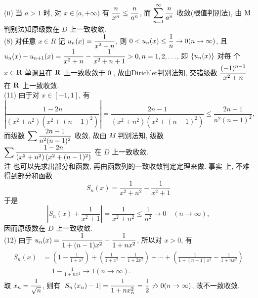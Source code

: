 \documentclass[a4paper,11pt,UTF8]{article}
\begin{document}
(ii) 当 $a>1$ 时, 对 $x \in[a,+\infty)$ 有 $\displaystyle \displaystyle \displaystyle \frac{n}{x^n} \leq \frac{n}{a^n}$, 而 $\displaystyle \displaystyle \displaystyle \sum_{n=1}^{\infty} \frac{n}{a^n}$ 收敛(根值判别法), 由 $\displaystyle \displaystyle \displaystyle \mathrm{M}$ 判别法知原级数在 $D$ 上一致收敛.\\
(8) 对任意 $x \in R$ 记 $\displaystyle \displaystyle \displaystyle u_n(x)=\frac{1}{x^2+n}$, 则 $\displaystyle \displaystyle \displaystyle 0<u_n(x) \leq \frac{1}{n} \rightarrow 0(n \rightarrow \infty)$, 且 $\displaystyle \displaystyle \displaystyle u_n(x)-u_{n+1}(x)=\frac{1}{x^2+n}-\frac{1}{x^2+n+1}>0, n=1,2, \ldots$, 即 $\displaystyle \displaystyle \displaystyle \left\{u_n(x)\right\}$ 对每 个 $x \in \mathbf{R}$ 单调且在 $\displaystyle \displaystyle \displaystyle \mathbf{R}$ 上一致收敛于 0 , 故由Dirichlet判别法知, 交错级数 $\displaystyle \displaystyle \displaystyle \frac{(-1)^{n-1}}{x^2+n}$ 在 $\displaystyle \displaystyle \displaystyle \mathbf{R}$ 上一致收敛.\\
(11) 由于对 $x \in[-1,1]$, 有
$$
\left|\frac{1-2 n}{\left(x^2+n^2\right)\left(x^2+(n-1)^2\right)}\right|=\frac{2 n-1}{\left(x^2+n^2\right)\left(x^2+(n-1)^2\right)} \leq \frac{2 n-1}{n^2(n-1)^2},
$$
而级数 $\displaystyle \displaystyle \displaystyle \sum \frac{2 n-1}{n^2(n-1)^2}$ 收敛, 故由 $M$ 判别法知, 级数 $\displaystyle \displaystyle \displaystyle \sum \frac{1-2 n}{\left(x^2+n^2\right)\left(x^2+(n-1)^2\right)}$ 在 $D$ 上一致收敛.\\
注 也可以先求出部分和函数, 再由函数列的一致收敛判定定理来做. 事实 上, 不难得到部分和函数\\
$$
S_n(x)=\frac{1}{x^2+n^2}-\frac{1}{x^2+1}
$$
于是
$$
\left|S_n(x)+\frac{1}{x^2+1}\right|=\frac{1}{x^2+n^2} \leq \frac{1}{n^2} \rightarrow 0 \quad(n \rightarrow \infty),
$$
因而原级数在 $D$ 上一致收敛.\\
(12) 由于 $\displaystyle \displaystyle \displaystyle u_n(x)=\frac{1}{1+(n-1) x^2}-\frac{1}{1+n x^2}$, 所以对 $x>0$, 有
$$
\begin{aligned}
	S_n(x) & =\left(1-\frac{1}{1+x^2}\right)+\left(\frac{1}{1+x^2}-\frac{1}{1+2 x^2}\right)+\cdots+\left(\frac{1}{1+(n-1) x^2}-\frac{1}{1+n x^2}\right) \\
	& =1-\frac{1}{1+n x^2} \rightarrow 1(n \rightarrow \infty) .
\end{aligned}
$$
取 $\displaystyle \displaystyle \displaystyle x_n=\frac{1}{\sqrt{n}}$, 则有 $\displaystyle \displaystyle \displaystyle \left|S_n\left(x_n\right)-1\right|=\frac{1}{1+n x_n^2}=\frac{1}{2} \not \rightarrow 0(n \rightarrow \infty)$, 故不一致收敛.\\
\end{document}

